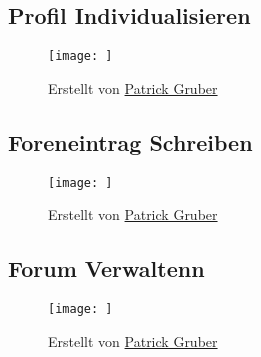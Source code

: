 \subsection*{Profil Individualisieren}
\begin{figure}[h!]
	\centering
	\texttt{[image: ]}
	\label{fig:ActDia_Profil_Individualisieren}
	\caption*{Erstellt von \hyperref[person:PatrickGruber]{Patrick Gruber}}
\end{figure}

\subsection*{Foreneintrag Schreiben}
\begin{figure}[h!]
	\centering
	\texttt{[image: ]}
	\label{fig:ActDia_Foreneinntrag_Schreiben}
	\caption*{Erstellt von \hyperref[person:PatrickGruber]{Patrick Gruber}}
\end{figure}

\subsection*{Forum Verwaltenn}
\begin{figure}[h!]
\centering
\texttt{[image: ]}
\label{fig:ActDia_Forum-Verwalten}
\caption*{Erstellt von \hyperref[person:PatrickGruber]{Patrick Gruber}}
\end{figure}